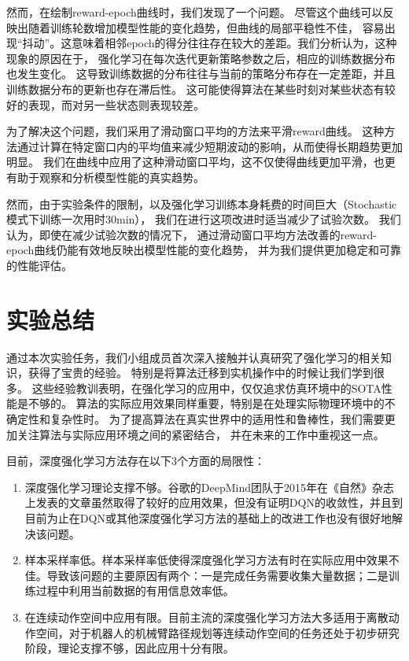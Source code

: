 \documentclass{thuemp}
\begin{document}
然而，在绘制reward-epoch曲线时，我们发现了一个问题。
尽管这个曲线可以反映出随着训练轮数增加模型性能的变化趋势，但曲线的局部平稳性不佳，
容易出现“抖动”。这意味着相邻epoch的得分往往存在较大的差距。我们分析认为，这种现象的原因在于，
强化学习在每次迭代更新策略参数之后，相应的训练数据分布也发生变化。
这导致训练数据的分布往往与当前的策略分布存在一定差距，并且训练数据分布的更新也存在滞后性。
这可能使得算法在某些时刻对某些状态有较好的表现，而对另一些状态则表现较差。

为了解决这个问题，我们采用了滑动窗口平均的方法来平滑reward曲线。
这种方法通过计算在特定窗口内的平均值来减少短期波动的影响，从而使得长期趋势更加明显。
我们在曲线中应用了这种滑动窗口平均，这不仅使得曲线更加平滑，也更有助于观察和分析模型性能的真实趋势。

然而，由于实验条件的限制，以及强化学习训练本身耗费的时间巨大（Stochastic模式下训练一次用时30min），
我们在进行这项改进时适当减少了试验次数。
我们认为，即使在减少试验次数的情况下，
通过滑动窗口平均方法改善的reward-epoch曲线仍能有效地反映出模型性能的变化趋势，
并为我们提供更加稳定和可靠的性能评估。\\
\vbox{}

\section{实验总结}
通过本次实验任务，我们小组成员首次深入接触并认真研究了强化学习的相关知识，获得了宝贵的经验。
特别是将算法迁移到实机操作中的时候让我们学到很多。
这些经验教训表明，在强化学习的应用中，仅仅追求仿真环境中的SOTA性能是不够的。
算法的实际应用效果同样重要，特别是在处理实际物理环境中的不确定性和复杂性时。
为了提高算法在真实世界中的适用性和鲁棒性，我们需要更加关注算法与实际应用环境之间的紧密结合，
并在未来的工作中重视这一点。

目前，深度强化学习方法存在以下3个方面的局限性\cite{enderfga}：
\begin{enumerate}
  \item 深度强化学习理论支撑不够。谷歌的DeepMind团队于2015年在《自然》杂志上发表的文章虽然取得了较好的应用效果，但没有证明DQN的收敛性，并且到目前为止在DQN或其他深度强化学习方法的基础上的改进工作也没有很好地解决该问题。
  \item 样本采样率低。样本采样率低使得深度强化学习方法有时在实际应用中效果不佳。导致该问题的主要原因有两个：一是完成任务需要收集大量数据；二是训练过程中利用当前数据的有用信息效率低。
  \item 在连续动作空间中应用有限。目前主流的深度强化学习方法大多适用于离散动作空间，对于机器人的机械臂路径规划等连续动作空间的任务还处于初步研究阶段，理论支撑不够，因此应用十分有限。
\end{enumerate}
\end{document}
